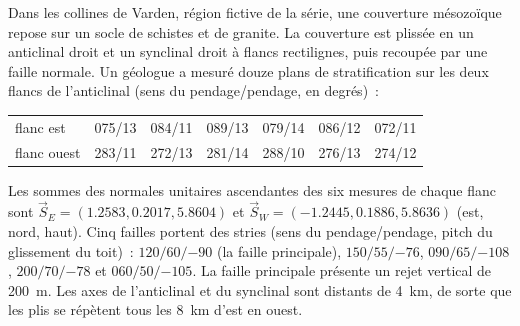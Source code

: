\begin{problem}
\label{pb:b3:structural-analysis:1}
Dans les collines de Varden, région fictive de la série, une couverture mésozoïque repose sur un
socle de schistes et de granite. La couverture est plissée en un anticlinal droit
et un synclinal droit à flancs rectilignes, puis recoupée par une faille normale. Un
géologue a mesuré douze plans de stratification sur les deux flancs de l'anticlinal
(sens du pendage/pendage, en degrés)~:

\begin{center}
\small
\begin{tabular}{l|cccccc}
\hline
flanc est & 075/13 & 084/11 & 089/13 & 079/14 & 086/12 & 072/11 \\
flanc ouest & 283/11 & 272/13 & 281/14 & 288/10 & 276/13 & 274/12 \\
\hline
\end{tabular}
\end{center}

Les sommes des normales unitaires ascendantes des six mesures de chaque flanc sont
$\vec S_E = (1.2583, 0.2017, 5.8604)$ et $\vec S_W = (-1.2445, 0.1886,
5.8636)$ (est, nord, haut). Cinq failles portent des stries (sens du pendage/pendage,
pitch du glissement du toit)~: $120/60/{-90}$ (la faille principale), $150/55/{-76}$,
$090/65/{-108}$, $200/70/{-78}$ et $060/50/{-105}$. La faille principale présente un
rejet vertical de \qty{200}{m}. Les axes de l'anticlinal et du synclinal sont distants
de \qty{4}{km}, de sorte que les plis se répètent tous les \qty{8}{km} d'est en ouest.


\end{problem}
